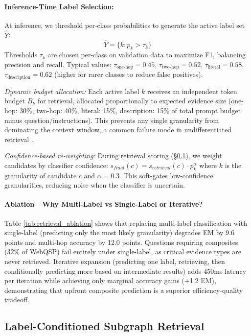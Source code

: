 \documentclass[conference]{IEEEtran}
\begin{document}
\paragraph{Inference-Time Label Selection:}
At inference, we threshold per-class probabilities to generate the active label set $\hat{Y}$:
\begin{equation}
\hat{Y} = \{k : p_k > \tau_k\}
\end{equation}
Thresholds $\tau_k$ are chosen per-class on validation data to maximize F1, balancing precision and recall. Typical values: $\tau_{\text{one-hop}}=0.45$, $\tau_{\text{two-hop}}=0.52$, $\tau_{\text{literal}}=0.58$, $\tau_{\text{description}}=0.62$ (higher for rarer classes to reduce false positives).

\emph{Dynamic budget allocation:} Each active label $k$ receives an independent token budget $B_k$ for retrieval, allocated proportionally to expected evidence size (one-hop: 30\%, two-hop: 40\%, literal: 15\%, description: 15\% of total prompt budget minus question/instructions). This prevents any single granularity from dominating the context window, a common failure mode in undifferentiated retrieval \cite{shi2023replug,izacard2021leverage}.

\emph{Confidence-based re-weighting:} During retrieval scoring (§\ref{sec:retrieval}), we weight candidates by classifier confidence: $s_{final}(c) = s_{retrieval}(c) \cdot p_k^{\alpha}$ where $k$ is the granularity of candidate $c$ and $\alpha=0.3$. This soft-gates low-confidence granularities, reducing noise when the classifier is uncertain.

\paragraph{Ablation—Why Multi-Label vs Single-Label or Iterative?}
Table \ref{tab:retrieval_ablation} shows that replacing multi-label classification with single-label (predicting only the most likely granularity) degrades EM by 9.6 points and multi-hop accuracy by 12.0 points. Questions requiring composites (32\% of WebQSP) fail entirely under single-label, as critical evidence types are never retrieved. Iterative expansion (predicting one label, retrieving, then conditionally predicting more based on intermediate results) adds 450ms latency per iteration while achieving only marginal accuracy gains (+1.2 EM), demonstrating that upfront composite prediction is a superior efficiency-quality tradeoff.

\subsection{Label-Conditioned Subgraph Retrieval}
\label{sec:retrieval}
\end{document}
